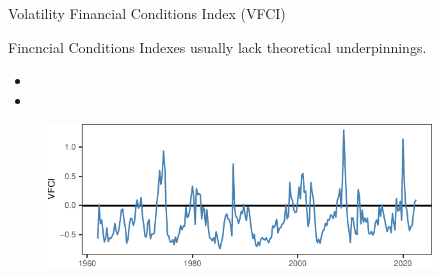 \begin{frame}{Volatility Financial Conditions Index (VFCI)}
    
    \label{vfci}

    Fincncial Conditions Indexes usually lack theoretical underpinnings.
    

    \begin{itemize}
        \item 
    
        \item
    
    \end{itemize}

    \vspace{0.5cm}
    
    \begin{figure}
        \includegraphics[height = 1.5in]{figs/fig2_vfci.pdf}
    \end{figure}
    
\end{frame}